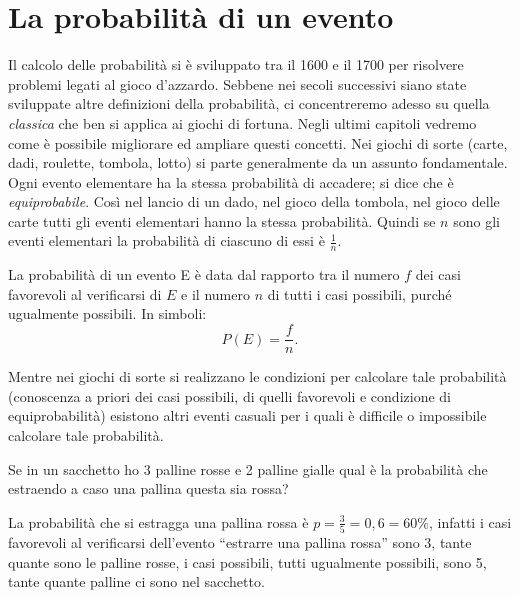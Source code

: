 \section{La probabilità di un evento}
\label{sec:02_definizioni}
Il calcolo delle probabilità si è sviluppato tra il 1600 e il 1700 per 
risolvere problemi legati al gioco d'azzardo. Sebbene nei secoli successivi 
siano state sviluppate altre definizioni della probabilità, ci concentreremo 
adesso su quella \emph{classica} che ben si applica ai giochi di fortuna. Negli 
ultimi capitoli vedremo come è possibile migliorare ed ampliare questi concetti.
Nei giochi di sorte (carte, dadi, roulette, tombola, lotto) si parte 
generalmente da un assunto fondamentale. Ogni evento elementare ha la stessa 
probabilità di accadere; si dice che è \emph{equiprobabile}.
Così nel lancio di un dado, nel gioco della tombola, nel 
gioco delle carte tutti gli eventi elementari hanno la stessa probabilità. 
Quindi se $n$ sono gli eventi elementari la probabilità di ciascuno di essi è 
$\frac 1 n$.

La probabilità di un evento E è data dal rapporto tra il numero $f$ dei casi 
favorevoli al verificarsi di $E$ e il numero $n$ di tutti i casi possibili, 
purché ugualmente possibili. In simboli: \[ P(E)=\dfrac f n. \]

Mentre nei giochi di sorte si realizzano le condizioni per calcolare tale 
probabilità (conoscenza a priori dei casi possibili, di quelli favorevoli e 
condizione di equiprobabilità) esistono altri eventi casuali per i quali è 
difficile o impossibile calcolare tale probabilità.

\begin{esempio}
Se in un sacchetto ho 3 palline rosse e 2 palline gialle qual è la 
probabilità 
che estraendo a caso una pallina questa sia rossa?

La probabilità che si estragga una pallina rossa è $p=\frac 3 
5=0,6=60\text{\%}$, infatti i casi favorevoli al verificarsi dell'evento 
``estrarre una pallina rossa'' sono 3, tante quante sono le palline rosse, i 
casi possibili, tutti ugualmente possibili, sono 5, tante quante palline ci 
sono 
nel sacchetto.
\end{esempio}

